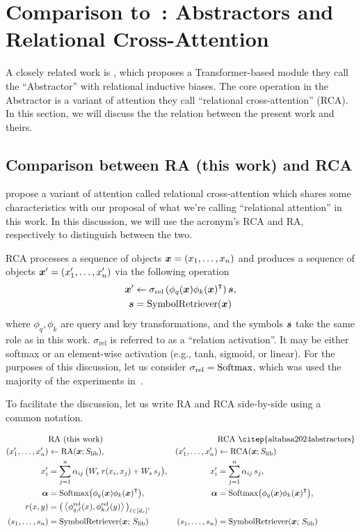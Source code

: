 \section{Comparison to~\citet{altabaa2024abstractors}: Abstractors and Relational Cross-Attention}

A closely related work is \citet{altabaa2024abstractors}, which proposes a Transformer-based module they call the ``Abstractor'' with relational inductive biases. The core operation in the Abstractor is a variant of attention they call ``relational cross-attention'' (RCA). In this section, we will discuss the the relation between the present work and theirs.

\subsection{Comparison between RA (this work) and RCA \citep{altabaa2024abstractors}}

\citet{altabaa2024abstractors} propose a variant of attention called relational cross-attention which shares some characteristics with our proposal of what we're calling ``relational attention'' in this work. In this discussion, we will use the acronym's RCA and RA, respectively to distinguish between the two.

RCA processes a sequence of objects $\bm{x} = (x_1, \ldots, x_n)$ and produces a sequence of objects $\bm{x}' = (x_1', \ldots, x_n')$ via the following operation
\begin{align*}
    \bm{x}' &\gets \sigma_{\mathrm{rel}}\left(\phi_q(\bm{x}) {\phi_k(\bm{x})}^\intercal\right) \bm{s}, \\
    \bm{s} &= \mathrm{SymbolRetriever}(\bm{x})
\end{align*}
where $\phi_q, \phi_k$ are query and key transformations, and the symbols $\bm{s}$ take the same role as in this work. $\sigma_{\mathrm{rel}}$ is referred to as a ``relation activation''. It may be either softmax or an element-wise activation (e.g., tanh, sigmoid, or linear). For the purposes of this discussion, let us consider $\sigma_{\mathrm{rel}} = \mathrm{Softmax}$, which was used the majority of the experiments in~\citep{altabaa2024abstractors}.

To facilitate the discussion, let us write RA and RCA side-by-side using a common notation.

\begin{align*}
&\text{RA (this work)}    & &\text{RCA \citep{altabaa2024abstractors}}\\
(x_1', \ldots, x_n') &\gets \RA(\x; \Slib), & (x_1', \ldots, x_n') &\gets \RCA(\x; \Slib)\\
x_i' &= \sum_{j=1}^{n} \alpha_{ij} \, \bigparen{W_r \, r(x_i, x_j) + W_s \, s_j}, & x_i' &= \sum_{j=1}^{n} \alpha_{ij} \, s_j,\\
\bm{\alpha} &= \Softmax\bigparen{\phi_q(\x) {\phi_k(\x)}^\intercal}, & \bm{\alpha} &= \Softmax\bigparen{\phi_q(\x) {\phi_k(\x)}^\intercal},\\
r(x, y) &= \bigparen{\iprod{\phi_{q,\ell}^{\rel}(x)}{\phi_{k,\ell}^{\rel}(y)}}_{\ell \in [d_r]}, & \\
(s_1, \ldots, s_n) &= \SymbolRetriever(\x;\,\Slib) & (s_1, \ldots, s_n) &= \SymbolRetriever(\x;\,\Slib)
\end{align*}

